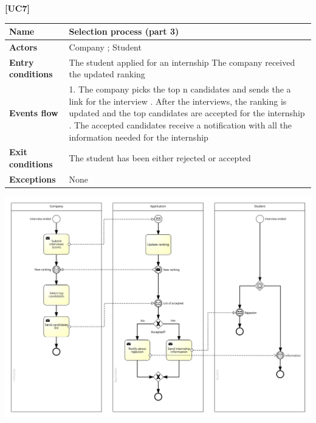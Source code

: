 \documentclass[11pt,twoside]{article}
\begin{document}
\newpage

\large{\textbf{[UC7]}} \\
\begin{table}[H]
\begin{tabular}{| p{} | p{} |}
\hline
\textbf{Name}
& Selection process (part 3) \\
\hline
\textbf{Actors}
& Company ; Student \\
\hline
\textbf{Entry conditions}
& The student applied for an internship \newline
The company received the updated ranking \\
\hline
\textbf{Events flow}
& 1. The company picks the top n candidates and sends the a link for the interview \newline
2. After the interviews, the ranking is updated and the top candidates are accepted for the internship \newline
3. The accepted candidates receive a notification with all the information needed for the internship \\
\hline
\textbf{Exit conditions}
& The student has been either rejected or accepted \\
\hline
\textbf{Exceptions}
& None \\
\hline
\end{tabular}
\end{table}

\begin{center}
\includegraphics[width=\textwidth]{Images/UC7}
\end{center}

\newpage
\end{document}
